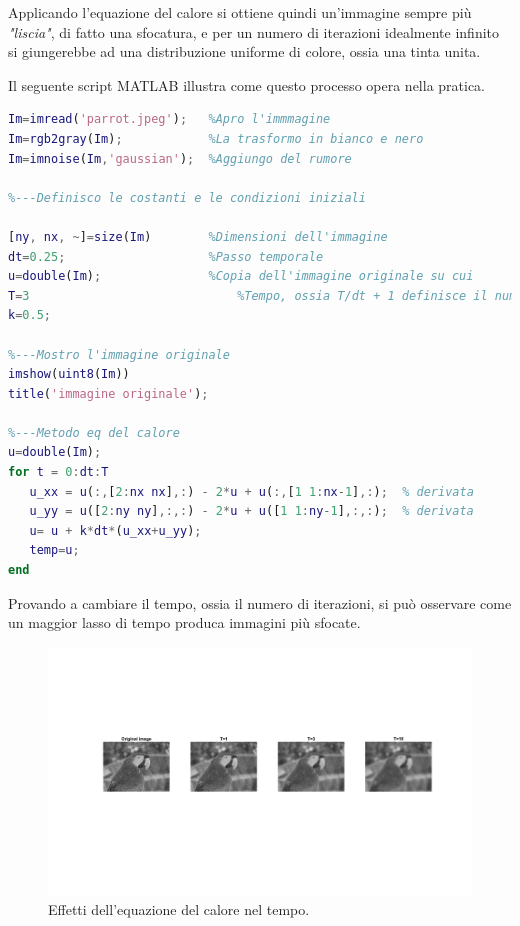 \vspace{1em}

Applicando l'equazione del calore si ottiene quindi un'immagine sempre più \textit{"liscia"}, di fatto una sfocatura, e per un numero di iterazioni idealmente infinito si giungerebbe ad una distribuzione uniforme di colore, ossia una tinta unita.

\vspace{1em}

Il seguente script MATLAB illustra come questo processo opera nella pratica.

\begin{lstlisting}[language=MATLAB]
Im=imread('parrot.jpeg');   %Apro l'immmagine
Im=rgb2gray(Im);            %La trasformo in bianco e nero
Im=imnoise(Im,'gaussian');  %Aggiungo del rumore

%---Definisco le costanti e le condizioni iniziali

[ny, nx, ~]=size(Im)        %Dimensioni dell'immagine
dt=0.25;                    %Passo temporale
u=double(Im);               %Copia dell'immagine originale su cui                                lavorare
T=3			                    %Tempo, ossia T/dt + 1 definisce il numero                           di iterazioni da eseguire
k=0.5;

%---Mostro l'immagine originale
imshow(uint8(Im))
title('immagine originale'); 

%---Metodo eq del calore
u=double(Im);
for t = 0:dt:T
   u_xx = u(:,[2:nx nx],:) - 2*u + u(:,[1 1:nx-1],:);  % derivata                                                           seconda lungo x
   u_yy = u([2:ny ny],:,:) - 2*u + u([1 1:ny-1],:,:);  % derivata                                                           seconda lungo y
   u= u + k*dt*(u_xx+u_yy);
   temp=u;
end

\end{lstlisting}
\newpage
Provando a cambiare il tempo, ossia il numero di iterazioni, si può osservare come un maggior lasso di tempo produca immagini più sfocate.

\begin{figure} 
\centering
\includegraphics[scale=0.27, trim = 10.9cm 16.9cm 10.9cm 14.9cm, clip]{Pictures/Risultati/eq del calore_striscia.png}
\caption{Effetti dell'equazione del calore nel tempo.}\label{fig:figura}
\end{figure}



